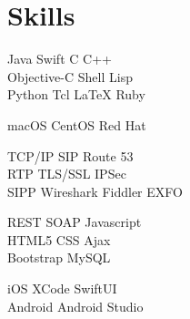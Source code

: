 \documentclass[a4paper]{lyu-resume} %
\begin{document}

\begin{minipage}[t]{0.33\textwidth} %


\section{Skills}

Java \textbullet{} Swift \textbullet{} C \textbullet{} C++\\
Objective-C \textbullet{} Shell \textbullet{} Lisp \\
Python \textbullet{} Tcl \textbullet{} \LaTeX \textbullet{} Ruby\\

\vspace{2 mm}

macOS \textbullet{} CentOS \textbullet{} Red Hat \\

\vspace{2 mm}

TCP/IP \textbullet{} SIP \textbullet{} Route 53 \\
\textbullet{} RTP \textbullet{} TLS/SSL \textbullet{} IPSec \\
SIPP \textbullet{} Wireshark \textbullet{} Fiddler \textbullet{} EXFO \\

\vspace{2 mm}

REST \textbullet{} SOAP \textbullet{} Javascript \\
HTML5 \textbullet{} CSS \textbullet{} Ajax \\ 
Bootstrap \textbullet{} MySQL \\ 

\vspace{2 mm}

iOS \textbullet{} XCode \textbullet{} SwiftUI \\ 
Android \textbullet{} Android Studio \\


\end{minipage}
\end{document}
